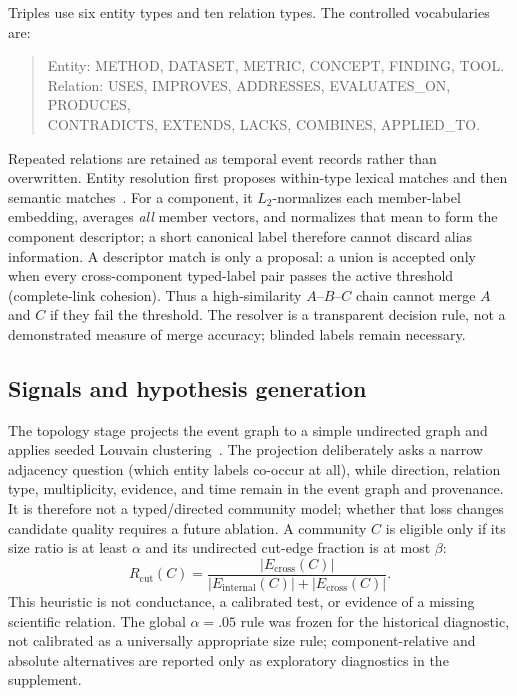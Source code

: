 \documentclass[runningheads]{llncs}
\begin{document}
Triples use six entity types and ten relation types. The controlled vocabularies are:
\begin{quote}\scriptsize
Entity: METHOD, DATASET, METRIC, CONCEPT, FINDING, TOOL.\\
Relation: USES, IMPROVES, ADDRESSES, EVALUATES\_ON, PRODUCES,\\
CONTRADICTS, EXTENDS, LACKS, COMBINES, APPLIED\_TO.
\end{quote}
Repeated relations are retained as temporal event records rather than overwritten. Entity resolution first proposes within-type lexical matches and then semantic matches~\cite{reimers2019sentence}. For a component, it $L_2$-normalizes each member-label embedding, averages \emph{all} member vectors, and normalizes that mean to form the component descriptor; a short canonical label therefore cannot discard alias information. A descriptor match is only a proposal: a union is accepted only when every cross-component typed-label pair passes the active threshold (complete-link cohesion). Thus a high-similarity $A$--$B$--$C$ chain cannot merge $A$ and $C$ if they fail the threshold. The resolver is a transparent decision rule, not a demonstrated measure of merge accuracy; blinded labels remain necessary.

\subsection{Signals and hypothesis generation}
The topology stage projects the event graph to a simple undirected graph and applies seeded Louvain clustering~\cite{blondel2008fast}. The projection deliberately asks a narrow adjacency question (which entity labels co-occur at all), while direction, relation type, multiplicity, evidence, and time remain in the event graph and provenance. It is therefore not a typed/directed community model; whether that loss changes candidate quality requires a future ablation. A community $C$ is eligible only if its size ratio is at least $\alpha$ and its undirected cut-edge fraction is at most $\beta$:
\[
R_{\mathrm{cut}}(C)=\frac{|E_{\mathrm{cross}}(C)|}{|E_{\mathrm{internal}}(C)|+|E_{\mathrm{cross}}(C)|}.
\]
This heuristic is not conductance, a calibrated test, or evidence of a missing scientific relation. The global $\alpha=.05$ rule was frozen for the historical diagnostic, not calibrated as a universally appropriate size rule; component-relative and absolute alternatives are reported only as exploratory diagnostics in the supplement.
\end{document}
